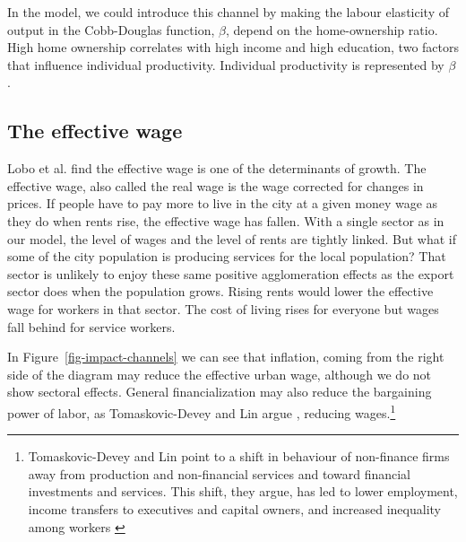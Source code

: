 In the model, we could introduce this channel by making the labour \gls{elasticity} of output in the Cobb-Douglas function, $\beta$, depend on the home-ownership ratio. High home ownership correlates with high income and high education, two factors that influence individual productivity. Individual productivity is represented by $\beta$. 

\subsection{The effective wage}
 Lobo et al. \cite{loboUrbanScalingProduction2013} find the \gls{effective wage} is one of the determinants of growth. The effective wage, also called the real wage is the wage corrected for changes in prices. If people have to pay more to live in the city at a given money wage as they do when rents rise, the effective wage has fallen. With a single sector as in our model, the level of wages and the level of rents are tightly linked. But what if some of the city population is producing services for the local population? That sector is unlikely to enjoy these same positive agglomeration effects as the export sector does when the population grows. Rising rents would lower the effective wage for workers in that sector. The cost of living rises for everyone but wages fall behind for service workers.  %

In Figure~\ref{fig-impact-channels} we can see that inflation, coming from the right side of the diagram may reduce the effective urban wage, although we do not show sectoral effects. 
General financialization may also reduce the bargaining power of labor, as Tomaskovic-Devey and Lin argue \cite{tomaskovic-deveyFinancializationCausesInequality2013}, reducing wages.\footnote{Tomaskovic-Devey and Lin point to a shift in behaviour of non-finance firms away from production and non-financial services and toward financial investments and services. This shift, they argue, has led to lower employment, income transfers to executives and capital owners, and increased inequality among workers \cite{tomaskovic-deveyFinancializationCausesInequality2013}}





